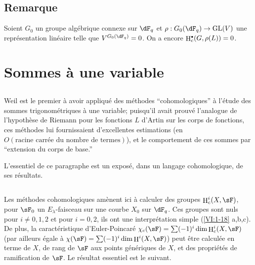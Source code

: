 \documentclass[oneside]{book}
\DeclareMathOperator{\h}{H}
\theoremstyle{sga-source}
\theoremstyle{sga-source-dash}
\theoremstyle{sga-source-dotdash}
\theoremstyle{sga-source-number-note-dash}
\theoremstyle{sga-source-note-number-dotdash}
\theoremstyle{sga-source-example-dotdash}
\theoremstyle{sga-source-inline-number}
\theoremstyle{sga-source-bare-number}
\theoremstyle{sga-source}
\let\oldbullet\bullet
\renewcommand{\bullet}{\textnormal{\tiny$\oldbullet$}}
\newcommand{\PrintPage}[1]{}\newcommand{\MathPage}[1]{}\newcommand{\PrintCite}[2]{#1}\newcommand{\var}[3]{#2}
\begin{document}
\subsection{Remarque}\label{VI:2-9}

Soient $G_0$ un groupe algébrique connexe sur $\dF_q$ et 
$\rho:G_0(\dF_q) \to \operatorname{GL}(V)$ une représentation linéaire 
telle que $V^{G_0(\dF_q)}=0$. On a encore $\h_c^\bullet(G,\rho(L))=0$. 










\PrintPage{189}
\section{Sommes à une variable}\label{VI:3}





\subsection{}\label{VI:3-1}

Weil est le premier à avoir appliqué des méthodes ``cohomologiques'' à 
l'étude des sommes trigonométriques à une variable; puisqu'il avait 
prouvé l'analogue de l'hypothèse de Riemann pour les fonctions $L$ d'Artin 
sur les corps de fonctions, ces méthodes lui fournissaient d'excellentes 
estimations (en $O(\text{racine carrée du nombre de termes})$), et le 
comportement de ces sommes par ``extension du corps de base.'' 

L'essentiel de ce paragraphe est un exposé, dans un langage cohomologique, de 
ses résultats. 





\subsection{}\label{VI:3-2}

Les méthodes cohomologiques amènent ici à calculer des groupes 
$\h_c^i(X,\sF)$, pour $\sF_0$ un $E_\lambda$-faisceau sur une courbe $X_0$ sur 
$\dF_q$. Ces groupes sont nuls pour $i\ne 0,1,2$ et pour 
$i=0,2$, ils ont une interprétation simple (\ref{VI:1-18} a,b,c). De plus, la 
caractéristique d'Euler-Poincaré 
$\chi_c(\sF) = \sum (-1)^i \dim \h_c^i(X,\sF)$ (par ailleurs égale à 
$\chi(\sF) = \sum (-1)^i \dim \h^i(X,\sF)$) peut être calculée en terme de 
$X$, de rang de $\sF$ aux points génériques de $X$, et des propriétés 
de ramification de $\sF$. Le résultat essentiel est le suivant. 
\end{document}
